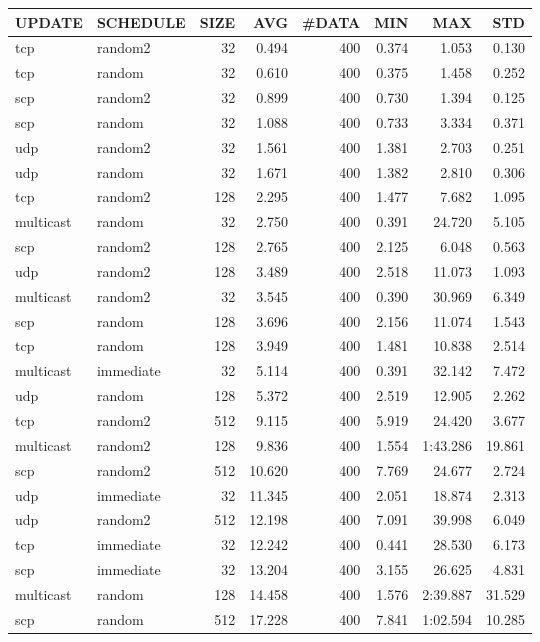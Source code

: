 \begin{tabular}{|l|l|r|r|r|r|r|r|}
\hline
UPDATE & SCHEDULE & SIZE & AVG & \#DATA & MIN & MAX & STD\\
\hline
tcp & random2 & 32 & 0.494 & 400 & 0.374 & 1.053 & 0.130\\
tcp & random & 32 & 0.610 & 400 & 0.375 & 1.458 & 0.252\\
scp & random2 & 32 & 0.899 & 400 & 0.730 & 1.394 & 0.125\\
scp & random & 32 & 1.088 & 400 & 0.733 & 3.334 & 0.371\\
udp & random2 & 32 & 1.561 & 400 & 1.381 & 2.703 & 0.251\\
udp & random & 32 & 1.671 & 400 & 1.382 & 2.810 & 0.306\\
tcp & random2 & 128 & 2.295 & 400 & 1.477 & 7.682 & 1.095\\
multicast & random & 32 & 2.750 & 400 & 0.391 & 24.720 & 5.105\\
scp & random2 & 128 & 2.765 & 400 & 2.125 & 6.048 & 0.563\\
udp & random2 & 128 & 3.489 & 400 & 2.518 & 11.073 & 1.093\\
multicast & random2 & 32 & 3.545 & 400 & 0.390 & 30.969 & 6.349\\
scp & random & 128 & 3.696 & 400 & 2.156 & 11.074 & 1.543\\
tcp & random & 128 & 3.949 & 400 & 1.481 & 10.838 & 2.514\\
multicast & immediate & 32 & 5.114 & 400 & 0.391 & 32.142 & 7.472\\
udp & random & 128 & 5.372 & 400 & 2.519 & 12.905 & 2.262\\
tcp & random2 & 512 & 9.115 & 400 & 5.919 & 24.420 & 3.677\\
multicast & random2 & 128 & 9.836 & 400 & 1.554 & 1:43.286 & 19.861\\
scp & random2 & 512 & 10.620 & 400 & 7.769 & 24.677 & 2.724\\
udp & immediate & 32 & 11.345 & 400 & 2.051 & 18.874 & 2.313\\
udp & random2 & 512 & 12.198 & 400 & 7.091 & 39.998 & 6.049\\
tcp & immediate & 32 & 12.242 & 400 & 0.441 & 28.530 & 6.173\\
scp & immediate & 32 & 13.204 & 400 & 3.155 & 26.625 & 4.831\\
multicast & random & 128 & 14.458 & 400 & 1.576 & 2:39.887 & 31.529\\
scp & random & 512 & 17.228 & 400 & 7.841 & 1:02.594 & 10.285\\

\end{tabular}
